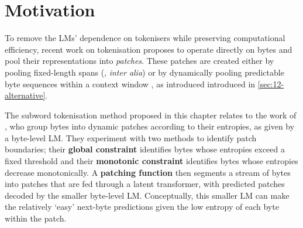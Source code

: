 
\section{Motivation}\label{sec:16-motivation}

To remove the LMs' dependence on tokenisers while preserving computational efficiency, recent work on tokenisation proposes to operate directly on bytes and pool their representations into \textit{patches}. These patches are created either by pooling fixed-length spans (\citealp{dai-etal-2020-funnel, nawrot-etal-2022-hierarchical, yu2023megabyte}, \textit{inter alia}) or by dynamically pooling predictable byte sequences within a context window \citep{nawrot-etal-2023-efficient, pagnoni2024byte}, as introduced introduced in \cref{sec:12-alternative}.

The subword tokenisation method proposed in this chapter relates to the work of \citet{pagnoni2024byte}, who group bytes into dynamic patches according to their entropies, as given by a byte-level LM. They experiment with two methods to identify patch boundaries; their \textbf{global constraint} identifies bytes whose entropies exceed a fixed threshold and their \textbf{monotonic constraint} identifies bytes whose entropies decrease monotonically. A \textbf{patching function} then segments a stream of bytes into patches that are fed through a latent transformer, with predicted patches decoded by the smaller byte-level LM. Conceptually, this smaller LM can make the relatively `easy' next-byte predictions given the low entropy of each byte within the patch.

